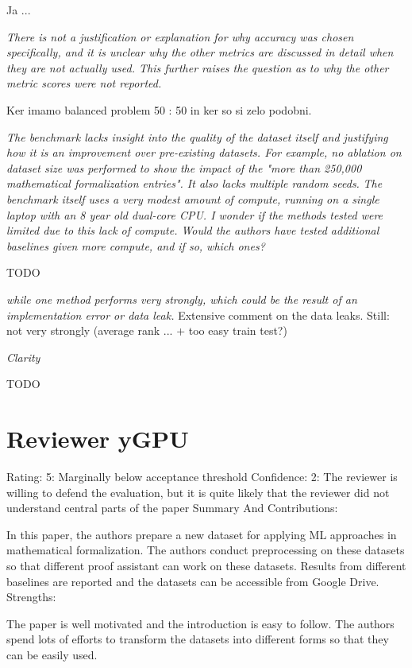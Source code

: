 \documentclass{article}
\begin{document}
Ja ...


\textit{There is not a justification or explanation for why accuracy was chosen specifically, and it is unclear why the other metrics are discussed in detail when they are not actually used. This further raises the question as to why the other metric scores were not reported.}

Ker imamo balanced problem 50 : 50 in ker so si zelo podobni.

\textit{The benchmark lacks insight into the quality of the dataset itself and justifying how it is an improvement over pre-existing datasets. For example, no ablation on dataset size was performed to show the impact of the "more than 250,000 mathematical formalization entries". It also lacks multiple random seeds.
}
\textit{The benchmark itself uses a very modest amount of compute, running on a single laptop with an 8 year old dual-core CPU. I wonder if the methods tested were limited due to this lack of compute. Would the authors have tested additional baselines given more compute, and if so, which ones?
}

TODO

\textit{while one method performs very strongly, which could be the result of an implementation error or data leak.}
Extensive comment on the data leaks.
Still: not very strongly (average rank ... + too easy train test?)

\textit{Clarity}

TODO




\section{Reviewer yGPU}

Rating: 5: Marginally below acceptance threshold
Confidence: 2: The reviewer is willing to defend the evaluation, but it is quite likely that the reviewer did not understand central parts of the paper
Summary And Contributions:

In this paper, the authors prepare a new dataset for applying ML approaches in mathematical formalization. The authors conduct preprocessing on these datasets so that different proof assistant can work on these datasets. Results from different baselines are reported and the datasets can be accessible from Google Drive.
Strengths:

    The paper is well motivated and the introduction is easy to follow.
    The authors spend lots of efforts to transform the datasets into different forms so that they can be easily used.
\end{document}
